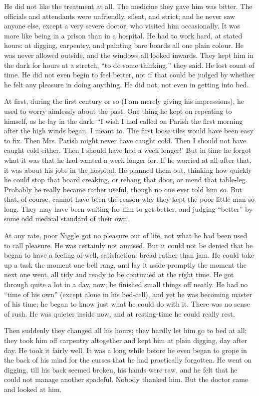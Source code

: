 \documentclass[english]{scrartcl}
\begin{document}
He did not like the treatment at all. The medicine they gave him was bitter. The officials and attendants were unfriendly, silent, and strict; and he never saw anyone else, except a very severe doctor, who visited him occasionally. It was more like being in a prison than in a hospital. He had to work hard, at stated hours: at digging, carpentry, and painting bare boards all one plain colour. He was never allowed outside, and the windows all looked inwards. They kept him in the dark for hours at a stretch, “to do some thinking,” they said. He lost count of time. He did not even begin to feel better, not if that could be judged by whether he felt any pleasure in doing anything. He did not, not even in getting into bed.

At first, during the first century or so (I am merely giving his impressions), he used to worry aimlessly about the past. One thing he kept on repeating to himself, as he lay in the dark: “I wish I had called on Parish the first morning after the high winds began. I meant to. The first loose tiles would have been easy to fix. Then Mrs. Parish might never have caught cold. Then I should not have caught cold either. Then I should have had a week longer!’ But in time he forgot what it was that he had wanted a week longer for. If he worried at all after that, it was about his jobs in the hospital. He planned them out, thinking how quickly he could stop that board creaking, or rehang that door, or mend that table-leg. Probably he really became rather useful, though no one ever told him so. But that, of course, cannot have been the reason why they kept the poor little man so long. They may have been waiting for him to get better, and judging “better” by some odd medical standard of their own.

At any rate, poor Niggle got no pleasure out of life, not what he had been used to call pleasure. He was certainly not amused. But it could not be denied that he began to have a feeling of-well, satisfaction: bread rather than jam. He could take up a task the moment one bell rang, and lay it aside promptly the moment the next one went, all tidy and ready to be continued at the right time. He got through quite a lot in a day, now; he finished small things off neatly. He had no “time of his own” (except alone in his bed-cell), and yet he was becoming master of his time; he began to know just what he could do with it. There was no sense of rush. He was quieter inside now, and at resting-time he could really rest.

Then suddenly they changed all his hours; they hardly let him go to bed at all; they took him off carpentry altogether and kept him at plain digging, day after day. He took it fairly well. It was a long while before he even began to grope in the back of his mind for the curses that he had practically forgotten. He went on digging, till his back seemed broken, his hands were raw, and he felt that he could not manage another spadeful. Nobody thanked him. But the doctor came and looked at him.
\end{document}
